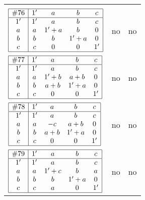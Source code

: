 \documentclass[12pt]{article}
\newcommand{\join}{\mathbin{+}}%
\newcommand{\id}{{1'}}%
\begin{document}
\begin{center}
\begin{longtable}{l|c|c}
{\begin{tikzpicture}[<->,shorten <=1pt,shorten >=1pt,label distance=0mm, font=\small]
\end{tikzpicture}
}     \\[15mm]

$
\begin{array}{|c|cccc|} \hline
\#76 & \id & a & b & c \\ \hline
\id & \id & a & b & c \\
a & a & \id \join a & b & 0 \\
b & b & b & \id \join a & 0 \\
c & c & 0 & 0 & \id \\ \hline
\end{array}
$
 & no  
 & no      \\[15mm]

$
\begin{array}{|c|cccc|} \hline
\#77 & \id & a & b & c \\ \hline
\id & \id & a & b & c \\
a & a & \id \join b & a \join b & 0 \\
b & b & a \join b & \id \join a & 0 \\
c & c & 0 & 0 & \id \\ \hline
\end{array}
$
 & no  
 & no      \\[15mm]

$
\begin{array}{|c|cccc|} \hline
\#78 & \id & a & b & c \\ \hline
\id & \id & a & b & c \\
a & a & -c & a \join b & 0 \\
b & b & a \join b & \id \join a & 0 \\
c & c & 0 & 0 & \id \\ \hline
\end{array}
$
 & no  
 & no      \\[15mm]

$
\begin{array}{|c|cccc|} \hline
\#79 & \id & a & b & c \\ \hline
\id & \id & a & b & c \\
a & a & \id \join c & b & a \\
b & b & b & \id \join a & 0 \\
c & c & a & 0 & \id \\ \hline
\end{array}
$
 & no  
 & no      \\[15mm]


\end{longtable}
\end{center}
\end{document}
